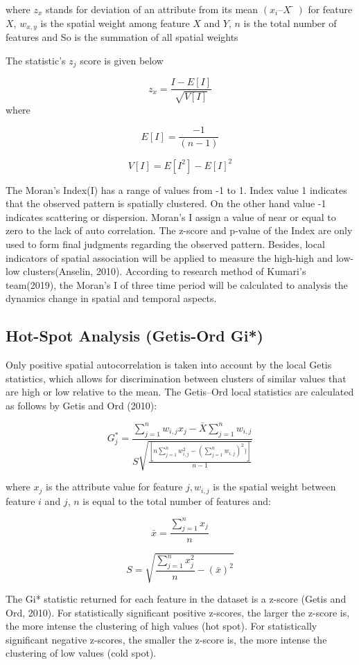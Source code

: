 \documentclass[
  12pt,
  oneside]{book}
\begin{document}
where \(z_x\) stands for deviation of an attribute from its mean \((x_i – X̅)\) for feature \(X\), \(w_{x,y}\) is the spatial weight among feature \(X\) and \(Y\), \(n\) is the total number of features and So is the summation of all spatial weights

The statistic's \(z_j\) score is given below

\[ 
z_x = \frac{I - E[I]}{\sqrt{V[I]}}
\]
where

\[
E[I] = \frac{-1}{(n-1)}
\]

\[
V[I] = E[I^2]-E[I]^2
\]

The Moran's Index(I) has a range of values from -1 to 1. Index value 1 indicates that the observed pattern is spatially clustered. On the other hand value -1 indicates scattering or dispersion. Moran's I assign a value of near or equal to zero to the lack of auto correlation. The z-score and p-value of the Index are only used to form final judgments regarding the observed pattern. Besides, local indicators of spatial association will be applied to measure the high-high and low-low clusters(Anselin, 2010). According to research method of Kumari's team(2019), the Moran's I of three time period will be calculated to analysis the dynamics change in spatial and temporal aspects.

\hypertarget{hot-spot-analysis-getis-ord-gi}{%
\subsection{Hot-Spot Analysis (Getis-Ord Gi*)}\label{hot-spot-analysis-getis-ord-gi}}

Only positive spatial autocorrelation is taken into account by the local Getis statistics, which allows for discrimination between clusters of similar values that are high or low relative to the mean. The Getis--Ord local statistics are calculated as follows by Getis and Ord (2010):

\[
G^*_j = \frac{\sum_{j=1}^nw_{i,j}x_j - \bar{X}\sum_{j=1}^{n}w_{i,j}}{S\sqrt{\frac{[n\sum_{j=1}^{n}w^2_{i,j} - (\sum_{j=1}^{n}w_{i,j})^2)]}{n-1}}}
\]

where \(x_j\) is the attribute value for feature \(j, w_{i,j}\) is the spatial weight between feature \(i\) and \(j\), \(n\) is equal to the total number of features and:

\[ 
\bar{x} = \frac{\sum_{j=1}^{n}x_j}{n}
\]

\[
S = \sqrt{\frac{\sum_{j=1}^{n}x^2_j}{n} -(\bar{x})^2}
\]

The Gi* statistic returned for each feature in the dataset is a z-score (Getis and Ord, 2010). For statistically significant positive z-scores, the larger the z-score is, the more intense the clustering of high values (hot spot). For statistically significant negative z-scores, the smaller the z-score is, the more intense the clustering of low values (cold spot).
\end{document}
